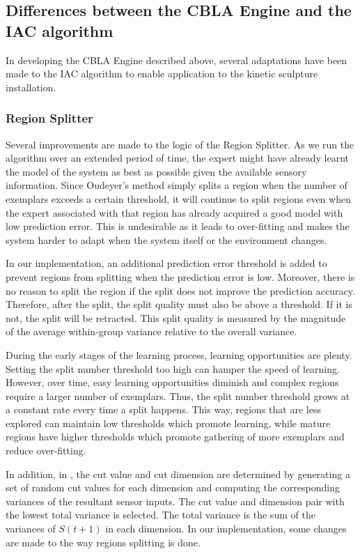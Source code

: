 \subsection{Differences between the CBLA Engine and the IAC algorithm}

In developing the CBLA Engine described above, several adaptations have been made to the IAC algorithm to enable application to the kinetic sculpture installation. 

\subsubsection{Region Splitter}

Several improvements are made to the logic of the Region Splitter. As we run the algorithm over an extended period of time, the expert might have already learnt the model of the system as best as possible given the available sensory information. Since Oudeyer's method simply splits a region when the number of exemplars exceeds a certain threshold, it will continue to split regions even when the expert associated with that region has already acquired a good model with low prediction error. This is undesirable as it leads to over-fitting and makes the system harder to adapt when the system itself or the environment changes. 

In our implementation, an additional prediction error threshold is added to prevent regions from splitting when the prediction error is low. Moreover, there is no reason to split the region if the split does not improve the prediction accuracy. Therefore, after the split, the split quality must also be above a threshold. If it is not, the split will be retracted. This split quality is measured by the magnitude of the average within-group variance relative to the overall variance.

During the early stages of the learning process, learning opportunities are plenty. Setting the split number threshold too high can hamper the speed of learning. However, over time, easy learning opportunities diminish and complex regions require a larger number of exemplars. Thus, the split number threshold grows at a constant rate every time a split happens. This way, regions that are less explored can maintain low thresholds which promote learning, while mature regions have higher thresholds which promote gathering of more exemplars and reduce over-fitting.

In addition, in \cite{Oudeyer2007}, the cut value and cut dimension are determined by generating a set of random cut values for each dimension and computing the corresponding variances of the resultant sensor inputs. The cut value and dimension pair with the lowest total variance is selected. The total variance is the sum of the variances of $S(t+1)$ in each dimension. In our implementation, some changes are made to the way regions splitting is done.

